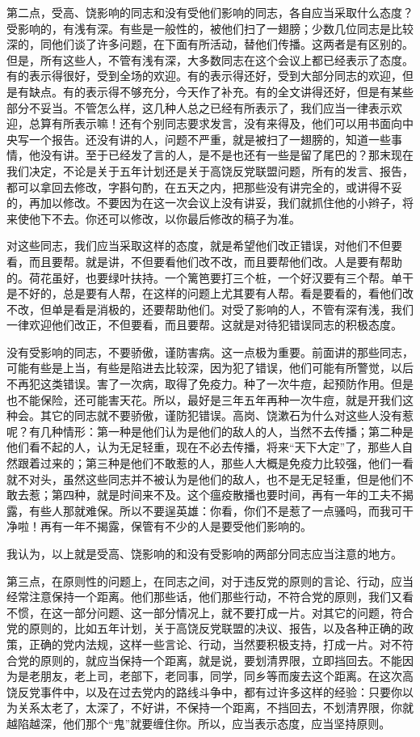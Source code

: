 第二点，受高、饶影响的同志和没有受他们影响的同志，各自应当采取什么态度？受影响的，有浅有深。有些是一般性的，被他们扫了一翅膀；少数几位同志是比较深的，同他们谈了许多问题，在下面有所活动，替他们传播。这两者是有区别的。但是，所有这些人，不管有浅有深，大多数同志在这个会议上都已经表示了态度。有的表示得很好，受到全场的欢迎。有的表示得还好，受到大部分同志的欢迎，但是有缺点。有的表示得不够充分，今天作了补充。有的全文讲得还好，但是有某些部分不妥当。不管怎么样，这几种人总之已经有所表示了，我们应当一律表示欢迎，总算有所表示嘛！还有个别同志要求发言，没有来得及，他们可以用书面向中央写一个报告。还没有讲的人，问题不严重，就是被扫了一翅膀的，知道一些事情，他没有讲。至于已经发了言的人，是不是也还有一些是留了尾巴的？那末现在我们决定，不论是关于五年计划还是关于高饶反党联盟问题，所有的发言、报告，都可以拿回去修改，字斟句酌，在五天之内，把那些没有讲完全的，或讲得不妥的，再加以修改。不要因为在这一次会议上没有讲妥，我们就抓住他的小辫子，将来使他下不去。你还可以修改，以你最后修改的稿子为准。

对这些同志，我们应当采取这样的态度，就是希望他们改正错误，对他们不但要看，而且要帮。就是讲，不但要看他们改不改，而且要帮他们改。人是要有帮助的。荷花虽好，也要绿叶扶持。一个篱笆要打三个桩，一个好汉要有三个帮。单干是不好的，总是要有人帮，在这样的问题上尤其要有人帮。看是要看的，看他们改不改，但单是看是消极的，还要帮助他们。对受了影响的人，不管有深有浅，我们一律欢迎他们改正，不但要看，而且要帮。这就是对待犯错误同志的积极态度。

没有受影响的同志，不要骄傲，谨防害病。这一点极为重要。前面讲的那些同志，可能有些是上当，有些是陷进去比较深，因为犯了错误，他们可能有所警觉，以后不再犯这类错误。害了一次病，取得了免疫力。种了一次牛痘，起预防作用。但是也不能保险，还可能害天花。所以，最好是三年五年再种一次牛痘，就是开我们这种会。其它的同志就不要骄傲，谨防犯错误。高岗、饶漱石为什么对这些人没有惹呢？有几种情形：第一种是他们认为是他们的敌人的人，当然不去传播；第二种是他们看不起的人，认为无足轻重，现在不必去传播，将来“天下大定”了，那些人自然跟着过来的；第三种是他们不敢惹的人，那些人大概是免疫力比较强，他们一看就不对头，虽然这些同志并不被认为是他们的敌人，也不是无足轻重，但是他们不敢去惹；第四种，就是时间来不及。这个瘟疫散播也要时间，再有一年的工夫不揭露，有些人那就难保。所以不要逞英雄：你看，你们不是惹了一点骚吗，而我可干净啦！再有一年不揭露，保管有不少的人是要受他们影响的。

我认为，以上就是受高、饶影响的和没有受影响的两部分同志应当注意的地方。

第三点，在原则性的问题上，在同志之间，对于违反党的原则的言论、行动，应当经常注意保持一个距离。他们那些话，他们那些行动，不符合党的原则，我们又看不惯，在这一部分问题、这一部分情况上，就不要打成一片。对其它的问题，符合党的原则的，比如五年计划，关于高饶反党联盟的决议、报告，以及各种正确的政策，正确的党内法规，这样一些言论、行动，当然要积极支持，打成一片。对不符合党的原则的，就应当保持一个距离，就是说，要划清界限，立即挡回去。不能因为是老朋友，老上司，老部下，老同事，同学，同乡等而废去这个距离。在这次高饶反党事件中，以及在过去党内的路线斗争中，都有过许多这样的经验：只要你以为关系太老了，太深了，不好讲，不保持一个距离，不挡回去，不划清界限，你就越陷越深，他们那个“鬼”就要缠住你。所以，应当表示态度，应当坚持原则。

